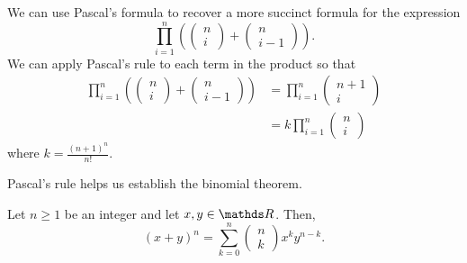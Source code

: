 \begin{example}
\label{exa:isi2021psa11}We can use Pascal's formula to recover a
more succinct formula for the expression
\[
\prod_{i=1}^{n}\left(\left(\begin{array}{c}
n\\
i
\end{array}\right)+\left(\begin{array}{c}
n\\
i-1
\end{array}\right)\right).
\]
We can apply Pascal's rule to each term in the product so that 
\begin{align*}
\prod_{i=1}^{n}\left(\left(\begin{array}{c}
n\\
i
\end{array}\right)+\left(\begin{array}{c}
n\\
i-1
\end{array}\right)\right) & =\prod_{i=1}^{n}\left(\begin{array}{c}
n+1\\
i
\end{array}\right)\\
 & =k\prod_{i=1}^{n}\left(\begin{array}{c}
n\\
i
\end{array}\right)
\end{align*}
where $k=\frac{\left(n+1\right)^{n}}{n!}.$
\end{example}

Pascal's rule helps us establish the binomial theorem.
\begin{thm}
\label{thm:binomialTheorem}Let $n\geq1$ be an integer and let $x,y\in\R$.
Then,
\[
\left(x+y\right)^{n}=\sum_{k=0}^{n}\left(\begin{array}{c}
n\\
k
\end{array}\right)x^{k}y^{n-k}.
\]
\end{thm}

